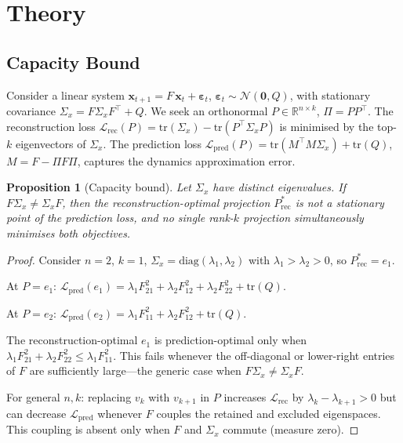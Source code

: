 \documentclass{article}
\newtheorem{proposition}{Proposition}
\begin{document}
\section{Theory}
\label{sec:theory}

\subsection{Capacity Bound}
\label{sec:capacity-bound}

Consider a linear system
$\mathbf{x}_{t+1} = F\,\mathbf{x}_t + \boldsymbol{\varepsilon}_t$,
$\boldsymbol{\varepsilon}_t \sim \mathcal{N}(\mathbf{0}, Q)$,
with stationary covariance $\Sigma_x = F\Sigma_x F^\top + Q$.
We seek an orthonormal $P \in \mathbb{R}^{n \times k}$,
$\Pi = PP^\top$.
The reconstruction loss
$\mathcal{L}_{\mathrm{rec}}(P)
= \mathrm{tr}(\Sigma_x) - \mathrm{tr}(P^\top\Sigma_x P)$
is minimised by the top-$k$ eigenvectors of $\Sigma_x$.
The prediction loss
$\mathcal{L}_{\mathrm{pred}}(P)
= \mathrm{tr}(M^\top M \Sigma_x) + \mathrm{tr}(Q)$,
$M = F - \Pi F \Pi$, captures the dynamics approximation error.

\begin{proposition}[Capacity bound]
\label{prop:capacity}
Let $\Sigma_x$ have distinct eigenvalues.
If $F\Sigma_x \neq \Sigma_x F$, then the reconstruction-optimal
projection $P_{\mathrm{rec}}^*$ is not a stationary point of the
prediction loss, and no single rank-$k$ projection simultaneously
minimises both objectives.
\end{proposition}

\begin{proof}
Consider $n{=}2$, $k{=}1$, $\Sigma_x = \mathrm{diag}(\lambda_1, \lambda_2)$
with $\lambda_1 > \lambda_2 > 0$, so $P_{\mathrm{rec}}^* = e_1$.

At $P = e_1$:
$\mathcal{L}_{\mathrm{pred}}(e_1) = \lambda_1 F_{21}^2 + \lambda_2 F_{12}^2 + \lambda_2 F_{22}^2 + \mathrm{tr}(Q)$.

At $P = e_2$:
$\mathcal{L}_{\mathrm{pred}}(e_2) = \lambda_1 F_{11}^2 + \lambda_2 F_{12}^2 + \mathrm{tr}(Q)$.

The reconstruction-optimal $e_1$ is prediction-optimal only when
$\lambda_1 F_{21}^2 + \lambda_2 F_{22}^2 \le \lambda_1 F_{11}^2$.
This fails whenever the off-diagonal or lower-right entries of $F$
are sufficiently large---the generic case when
$F\Sigma_x \neq \Sigma_x F$.

For general $n,k$: replacing $v_k$ with $v_{k+1}$ in $P$ increases
$\mathcal{L}_{\mathrm{rec}}$ by $\lambda_k - \lambda_{k+1} > 0$ but
can decrease $\mathcal{L}_{\mathrm{pred}}$ whenever $F$ couples the
retained and excluded eigenspaces.  This coupling is absent only when
$F$ and $\Sigma_x$ commute (measure zero).
\end{proof}
\end{document}
